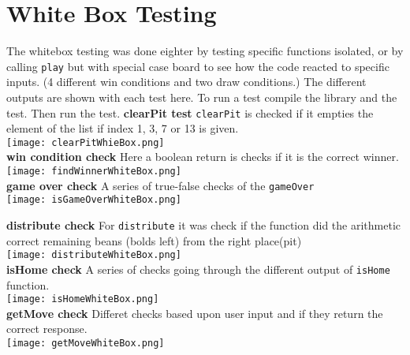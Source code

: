 \documentclass{article}
\begin{document}
    	\section{White Box Testing}
   		The whitebox testing was done eighter by testing specific functions isolated, or by calling \verb|play| but with special case board to see how the code reacted to specific inputs. (4 different win conditions and two draw conditions.) The different outputs are shown with each test here. 
   		To run a test compile the library and the test. Then run the test. 
   		\textbf{clearPit test}\newline
        \verb|clearPit| is checked if it empties the element of the list if index 1, 3, 7 or 13 is given.\\
        \texttt{[image: clearPitWhieBox.png]}
        \\
          \textbf{win condition check}\newline
        Here a boolean return is checks if it is the correct winner. 
        \\
        \texttt{[image: findWinnerWhiteBox.png]}
        \\
        \textbf{game over check}\newline
        A series of true-false checks of the \verb|gameOver| 
        \\
        \texttt{[image: isGameOverWhiteBox.png]}
        
        \newpage
        \textbf{distribute check}\newline
        For \verb|distribute| it was check if the function did the arithmetic correct remaining beans (bolds left) from the right place(pit)
        \\
        \texttt{[image: distributeWhiteBox.png]}
        \\
      
         
     
        \textbf{isHome check}\newline
       A series of checks going through the different output of \verb|isHome| function. 
        \\
        \texttt{[image: isHomeWhiteBox.png]}
        \\
 
        \textbf{getMove check}\newline
        Differet checks based upon user input and if they return the correct response. 
        \\
        \texttt{[image: getMoveWhiteBox.png]}
        \newpage
        
\end{document}
